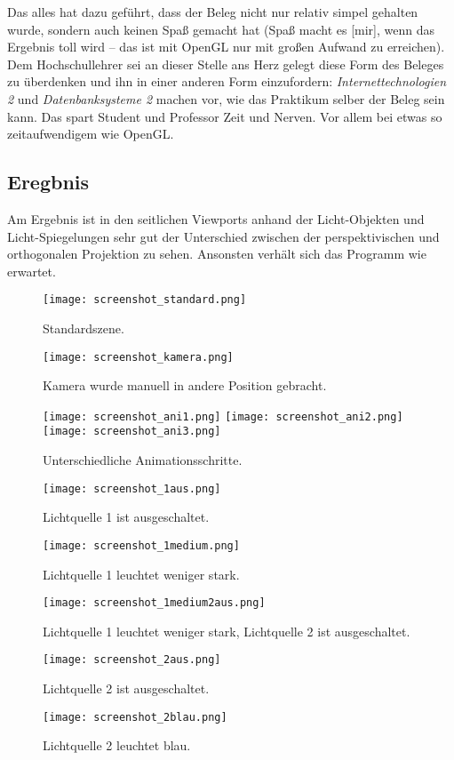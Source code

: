 \documentclass{scrreprt}
\begin{document}
Das alles hat dazu geführt, dass der Beleg nicht nur relativ simpel gehalten wurde, sondern auch keinen Spaß gemacht hat (Spaß macht es [mir], wenn das Ergebnis toll wird -- das ist mit OpenGL nur mit großen Aufwand zu erreichen). Dem Hochschullehrer sei an dieser Stelle ans Herz gelegt diese Form des Beleges zu überdenken und ihn in einer anderen Form einzufordern: \emph{Internettechnologien 2} und \emph{Datenbanksysteme 2} machen vor, wie das Praktikum selber der Beleg sein kann. Das spart Student und Professor Zeit und Nerven. Vor allem bei etwas so zeitaufwendigem wie OpenGL.


\subsection{Eregbnis}

Am Ergebnis ist in den seitlichen Viewports anhand der Licht-Objekten und Licht-Spiegelungen sehr gut der Unterschied zwischen der perspektivischen und orthogonalen Projektion zu sehen. Ansonsten verhält sich das Programm wie erwartet.

\begin{figure}[!ht]
\centering
\texttt{[image: screenshot\_standard.png]}
\caption{Standardszene.}
\label{img:standard}
\end{figure}
\begin{figure}[!ht]
\centering
\texttt{[image: screenshot\_kamera.png]}
\caption{Kamera wurde manuell in andere Position gebracht.}
\label{img:kamera}
\end{figure}
\begin{figure}[!ht]
\centering
\texttt{[image: screenshot\_ani1.png]}
\texttt{[image: screenshot\_ani2.png]}
\texttt{[image: screenshot\_ani3.png]}
\caption{Unterschiedliche Animationsschritte.}
\label{img:ani}
\end{figure}
\begin{figure}[!ht]
\centering
\texttt{[image: screenshot\_1aus.png]}
\caption{Lichtquelle 1 ist ausgeschaltet.}
\label{img:1aus}
\end{figure}
\begin{figure}[!ht]
\centering
\texttt{[image: screenshot\_1medium.png]}
\caption{Lichtquelle 1 leuchtet weniger stark.}
\label{img:1medium}
\end{figure}
\begin{figure}[!ht]
\centering
\texttt{[image: screenshot\_1medium2aus.png]}
\caption{Lichtquelle 1 leuchtet weniger stark, Lichtquelle 2 ist ausgeschaltet.}
\label{img:1medium2aus}
\end{figure}
\begin{figure}[!ht]
\centering
\texttt{[image: screenshot\_2aus.png]}
\caption{Lichtquelle 2 ist ausgeschaltet.}
\label{img:2aus}
\end{figure}
\begin{figure}[!ht]
\centering
\texttt{[image: screenshot\_2blau.png]}
\caption{Lichtquelle 2 leuchtet blau.}
\label{img:2blau}
\end{figure}
\end{document}
